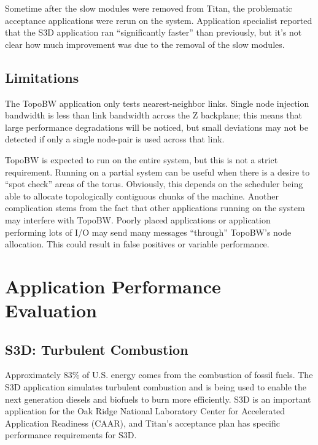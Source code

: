 \documentclass[10pt, conference, compsocconf]{IEEEtran}
\begin{document}
Sometime after the slow modules were removed from Titan, the problematic
acceptance applications were rerun on the system.  Application specialist
reported that the S3D application ran ``significantly faster'' than previously,
but it's not clear how much improvement was due to the removal of the slow
modules.

\subsection{Limitations}

The TopoBW application only tests nearest-neighbor links. Single node injection
bandwidth is less than link bandwidth across the Z backplane; this means that
large performance degradations will be noticed, but small deviations may not be
detected if only a single node-pair is used across that link.

TopoBW is expected to run on the entire system, but this is not a strict
requirement.  Running on a partial system can be useful when there is a desire
to ``spot check'' areas of the torus.  Obviously, this depends on the scheduler
being able to allocate topologically contiguous chunks of the machine.  Another
complication stems from the fact that other applications running on the system
may interfere with TopoBW.  Poorly placed applications or application
performing lots of I/O may send many messages ``through'' TopoBW's node
allocation.  This could result in false positives or variable performance.




\section{Application Performance Evaluation}

\subsection{S3D: Turbulent Combustion}

Approximately 83\% of U.S. energy comes from the combustion of fossil fuels.
The S3D application simulates turbulent combustion and is being used to enable
the next generation diesels and biofuels to burn more efficiently.  S3D is an
important application for the Oak Ridge National Laboratory Center for
Accelerated Application Readiness (CAAR), and Titan's acceptance plan has
specific performance requirements for S3D. 
\end{document}
